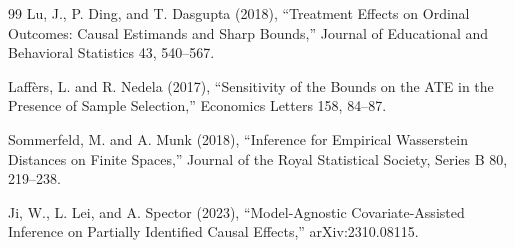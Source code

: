 \documentclass{article}
\begin{document}
\begin{thebibliography}{99}
   Lu, J., P. Ding, and T. Dasgupta (2018), ``Treatment Effects on Ordinal Outcomes: Causal Estimands and Sharp Bounds,'' Journal of Educational and Behavioral Statistics 43, 540--567.

   Laff\`ers, L. and R. Nedela (2017), ``Sensitivity of the Bounds on the ATE in the Presence of Sample Selection,'' Economics Letters 158, 84--87.

   Sommerfeld, M. and A. Munk (2018), ``Inference for Empirical Wasserstein Distances on Finite Spaces,'' Journal of the Royal Statistical Society, Series B 80, 219--238.

   Ji, W., L. Lei, and A. Spector (2023), ``Model-Agnostic Covariate-Assisted Inference on Partially Identified Causal Effects,'' arXiv:2310.08115.

\end{thebibliography}
\end{document}
